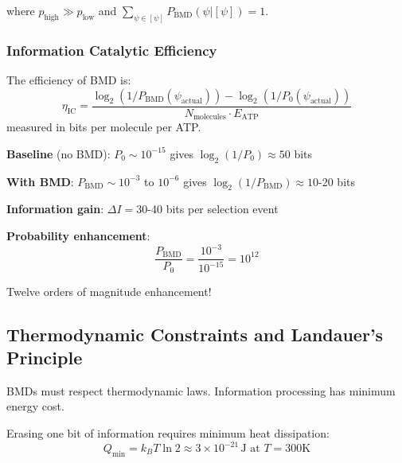 \documentclass[11pt,onecolumn]{article}
\begin{document}
where $p_{\text{high}} \gg p_{\text{low}}$ and $\sum_{\psi \in [\psi]} P_{\text{BMD}}(\psi | [\psi]) = 1$.

\subsubsection{Information Catalytic Efficiency}

\begin{definition}
The efficiency of BMD is:
\begin{equation}
\eta_{\text{IC}} = \frac{\log_2(1/P_{\text{BMD}}(\psi_{\text{actual}})) - \log_2(1/P_0(\psi_{\text{actual}}))}{N_{\text{molecules}} \cdot E_{\text{ATP}}}
\end{equation}
measured in bits per molecule per ATP.
\end{definition}

\textbf{Baseline} (no BMD): $P_0 \sim 10^{-15}$ gives $\log_2(1/P_0) \approx 50$ bits

\textbf{With BMD}: $P_{\text{BMD}} \sim 10^{-3}$ to $10^{-6}$ gives $\log_2(1/P_{\text{BMD}}) \approx 10$-20 bits

\textbf{Information gain}: $\Delta I = 30$-40 bits per selection event

\textbf{Probability enhancement}:
\begin{equation}
\frac{P_{\text{BMD}}}{P_0} = \frac{10^{-3}}{10^{-15}} = 10^{12}
\end{equation}

Twelve orders of magnitude enhancement!

\subsection{Thermodynamic Constraints and Landauer's Principle}

BMDs must respect thermodynamic laws. Information processing has minimum energy cost.

\begin{theorem}
\label{thm:landauer}
Erasing one bit of information requires minimum heat dissipation:
\begin{equation}
Q_{\text{min}} = k_B T \ln 2 \approx 3 \times 10^{-21}\,\text{J at } T=300\text{K}
\end{equation}
\end{theorem}
\end{document}
